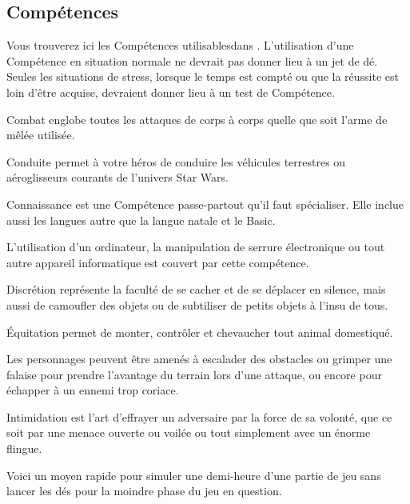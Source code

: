 \subsection{Compétences}
Vous trouverez ici les Compétences utilisables\footnotemark[1] dans \swfe. L’utilisation d’une Compétence en situation normale ne devrait pas donner lieu à un jet de dé. Seules les situations de stress, lorsque le temps est compté ou que la réussite est loin d’être acquise, devraient donner lieu à un test de Compétence.


\begin{description}[align=left]
    \item [Combat (Agi)]
        Combat englobe toutes les attaques de corps à corps quelle que soit l’arme de mêlée utilisée.
    \item [Conduite (Agi)]
        Conduite permet à votre héros de conduire les véhicules terrestres ou aéroglisseurs courants de l'univers Star Wars.
    \item [Connaissance (Int)]
        Connaissance est une Compétence passe-partout qu’il faut spécialiser. Elle inclue aussi les langues autre que la langue natale et le Basic.
    \item [Piratage (Int)]
        L'utilisation d'un ordinateur, la manipulation de serrure électronique ou tout autre appareil informatique est couvert par cette compétence.
    \item [Discrétion (Agi)]
        Discrétion représente la faculté de se cacher et de se déplacer en silence, mais aussi de camoufler des objets ou de subtiliser de petits objets à l’insu de tous.
    \item [Équitation (Agi)]
        Équitation permet de monter, contrôler et chevaucher tout animal domestiqué.
    \item [Escalade (For)]
        Les personnages peuvent être amenés à escalader des obstacles ou grimper une falaise pour prendre l'avantage du terrain lors d'une attaque, ou encore pour échapper à un ennemi trop coriace.
    \item [Intimidation (\^Ame)]
        Intimidation est l’art d’effrayer un adversaire par la force de sa volonté, que ce soit par une menace ouverte ou voilée ou tout simplement avec un énorme flingue.
    \item [Jeu (Int)]
        Voici un moyen rapide pour simuler une demi-heure d’une partie de jeu sans lancer les dés pour la moindre phase du jeu en question.

\end{description}
